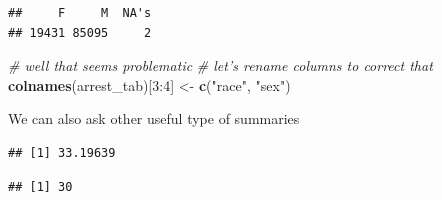 \documentclass[]{article}
\newenvironment{Shaded}{\begin{snugshade}}{\end{snugshade}}
\newcommand{\KeywordTok}[1]{\textcolor[rgb]{0.13,0.29,0.53}{\textbf{{#1}}}}
\newcommand{\DecValTok}[1]{\textcolor[rgb]{0.00,0.00,0.81}{{#1}}}
\newcommand{\StringTok}[1]{\textcolor[rgb]{0.31,0.60,0.02}{{#1}}}
\newcommand{\CommentTok}[1]{\textcolor[rgb]{0.56,0.35,0.01}{\textit{{#1}}}}
\newcommand{\NormalTok}[1]{{#1}}
\theoremstyle{definition}
\theoremstyle{definition}
\theoremstyle{remark}
\begin{document}
\begin{verbatim}
##     F     M  NA's 
## 19431 85095     2
\end{verbatim}

\begin{Shaded}
\begin{Highlighting}[]
\CommentTok{# well that seems problematic}
\CommentTok{# let's rename columns to correct that}
\KeywordTok{colnames}\NormalTok{(arrest_tab)[}\DecValTok{3}\NormalTok{:}\DecValTok{4}\NormalTok{] <-}\StringTok{ }\KeywordTok{c}\NormalTok{(}\StringTok{"race"}\NormalTok{, }\StringTok{"sex"}\NormalTok{)}
\end{Highlighting}
\end{Shaded}

We can also ask other useful type of summaries

\begin{Shaded}
\end{Shaded}

\begin{verbatim}
## [1] 33.19639
\end{verbatim}

\begin{Shaded}
\end{Shaded}

\begin{verbatim}
## [1] 30
\end{verbatim}

\begin{Shaded}
\end{Shaded}
\end{document}
